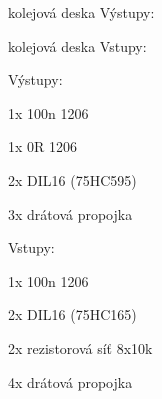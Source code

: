 \documentclass[a4paper]{report}
\begin{document}
kolejová deska Výstupy:

\vspace{7cm}

kolejová deska Vstupy:

\newcommand{\jmi}{RPi_SPI_outputs_v04}
\newcommand{\jmo}{RPi_SPI_inputs_v04}

\vspace{8cm}

Výstupy:

1x 100n 1206

1x 0R 1206

2x DIL16 (75HC595)

3x drátová propojka

\vspace{1cm}

Vstupy:

1x 100n 1206

2x DIL16 (75HC165)

2x rezistorová síť 8x10k

4x drátová propojka
\end{document}
